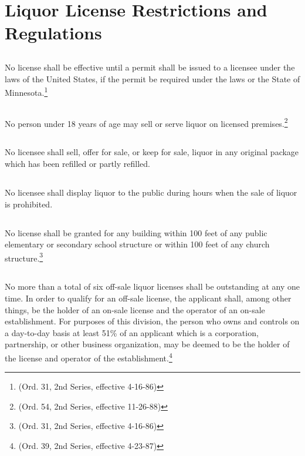 \section{Liquor License Restrictions and Regulations}
\subsection{}
No license shall be effective until a permit shall be issued to a licensee under the laws of the United States, if the permit be required under the laws or the State of Minnesota.\footnote{(Ord. 31, 2nd Series, effective 4-16-86)}
\subsection{}
No person under 18 years of age may sell or serve liquor on licensed premises.\footnote{(Ord. 54, 2nd Series, effective 11-26-88)}
\subsection{}
No licensee shall sell, offer for sale, or keep for sale, liquor in any original package which has been refilled or partly refilled.
\subsection{}
No licensee shall display liquor to the public during hours when the sale of liquor is prohibited.
\subsection{}
No license shall be granted for any building within 100 feet of any public elementary or secondary school structure or within 100 feet of any church structure.\footnote{(Ord. 31, 2nd Series, effective 4-16-86)}
\subsection{}
No more than a total of six off-sale liquor licenses shall be outstanding at any one time.  In order to qualify for an off-sale license, the applicant shall, among other things, be the holder of an on-sale license and the operator of an on-sale establishment.  For purposes of this division, the person who owns and controls on a day-to-day basis at least 51\% of an applicant which is a corporation, partnership, or other business organization, may be deemed to be the holder of the license and operator of the establishment.\footnote{(Ord. 39, 2nd Series, effective 4-23-87)}
